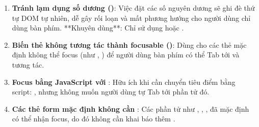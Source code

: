 \begin{warnBox}
\begin{enumerate}[leftmargin=1.5em, itemsep=4pt, parsep=0pt]
    \item \textbf{Tránh lạm dụng số dương ()}: Việc đặt các số nguyên dương sẽ ghi đè thứ tự DOM tự nhiên, dễ gây rối loạn và mất phương hướng cho người dùng chỉ dùng bàn phím. **Khuyên dùng**: Chỉ sử dụng  hoặc .
    \item \textbf{Biến thẻ không tương tác thành focusable ()}: Dùng cho các thẻ mặc định không thể focus (như , ) để người dùng bàn phím có thể Tab tới và tương tác.
    \item \textbf{Focus bằng JavaScript với }: Hữu ích khi cần chuyển tiêu điểm bằng script: , nhưng không muốn người dùng tự Tab tới phần tử đó.
    \item \textbf{Các thẻ form mặc định không cần }: Các phần tử như , , ,  đã mặc định có thể nhận focus, do đó không cần khai báo thêm .
\end{enumerate}
\end{warnBox}



